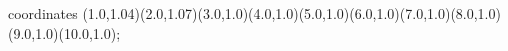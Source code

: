 					coordinates { (1.0,1.04)(2.0,1.07)(3.0,1.0)(4.0,1.0)(5.0,1.0)(6.0,1.0)(7.0,1.0)(8.0,1.0)(9.0,1.0)(10.0,1.0)};